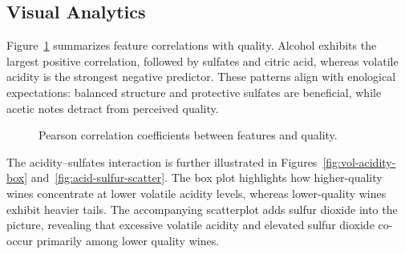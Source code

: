 \documentclass[11pt]{article}
\begin{document}
\subsection{Visual Analytics}
Figure~\ref{fig:correlation-bar} summarizes feature correlations with quality.
Alcohol exhibits the largest positive correlation, followed by sulfates and
citric acid, whereas volatile acidity is the strongest negative predictor. These
patterns align with enological expectations: balanced structure and protective
sulfates are beneficial, while acetic notes detract from perceived quality.


\begin{figure}[H]
  \centering
  \caption{Pearson correlation coefficients between features and quality.}
  \label{fig:correlation-bar}
\end{figure}

The acidity--sulfates interaction is further illustrated in
Figures~\ref{fig:vol-acidity-box} and~\ref{fig:acid-sulfur-scatter}. The box plot
highlights how higher-quality wines concentrate at lower volatile acidity
levels, whereas lower-quality wines exhibit heavier tails. The accompanying
scatterplot adds sulfur dioxide into the picture, revealing that excessive
volatile acidity and elevated sulfur dioxide co-occur primarily among lower
quality wines.
\end{document}
